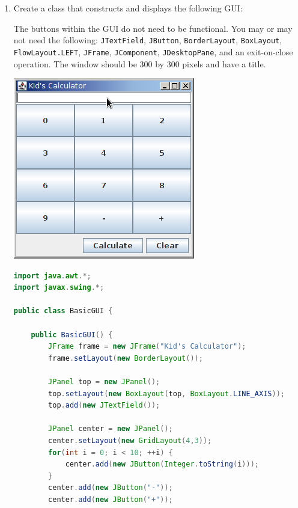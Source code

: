 \documentclass[11pt]{article}
\newenvironment{answer}{\large\lstset{basicstyle=\tiny\ttfamily}\color{white} }{}
\newenvironment{answer}{\large\lstset{basicstyle=\large\ttfamily}\color{red} }{}
\begin{document}
\begin{enumerate}
\newpage
\item Create a class that constructs and displays the following GUI: \\
\begin{minipage}{0.5\textwidth}
\vspace{-48pt}
The buttons within the GUI do not need to be functional.  You may or may not need the following: \texttt{JTextField}, \texttt{JButton}, \texttt{BorderLayout}, \texttt{BoxLayout}, \texttt{FlowLayout.LEFT}, \texttt{JFrame}, \texttt{JComponent}, \texttt{JDesktopPane}, and an exit-on-close operation.  The window should be 300 by 300 pixels and have a title.
\end{minipage}
\hspace{50px}
\begin{minipage}{0.3\textwidth}
\includegraphics[scale=0.6]{calculator.png}
\end{minipage} \hfill

\vspace{-48pt}
\begin{answer}
\begin{lstlisting}[language=java,basicstyle=\small]
import java.awt.*;
import javax.swing.*;

public class BasicGUI {

	public BasicGUI() {
		JFrame frame = new JFrame("Kid's Calculator");
		frame.setLayout(new BorderLayout());
		
		JPanel top = new JPanel();
		top.setLayout(new BoxLayout(top, BoxLayout.LINE_AXIS));
		top.add(new JTextField());
		
		JPanel center = new JPanel();
		center.setLayout(new GridLayout(4,3));
		for(int i = 0; i < 10; ++i) {
			center.add(new JButton(Integer.toString(i)));
		}
		center.add(new JButton("-"));
		center.add(new JButton("+"));
		

\end{lstlisting}
\end{answer}
\end{enumerate}
\end{document}

